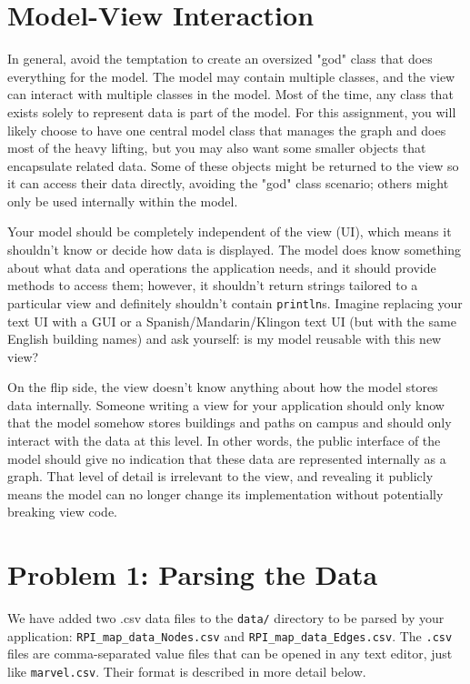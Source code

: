 \documentclass[11pt]{article}
\begin{document}
\section*{Model-View Interaction}
\label{sec:Model-View Interaction}

In general, avoid the temptation to create an oversized "god" class that does everything for the model. The model may contain multiple classes, and the view can interact with multiple classes in the model. Most of the time, any class that exists solely to represent data is part of the model. For this assignment, you will likely choose to have one central model class that manages the graph and does most of the heavy lifting, but you may also want some smaller objects that encapsulate related data. Some of these objects might be returned to the view so it can access their data directly, avoiding the "god" class scenario; others might only be used internally within the model.

\noindent Your model should be completely independent of the view (UI), which means it shouldn't know or decide how data is displayed. The model does know something about what data and operations the application needs, and it should provide methods to access them; however, it shouldn't return strings tailored to a particular view and definitely shouldn't contain \texttt{println}s. Imagine replacing your text UI with a GUI or a Spanish/Mandarin/Klingon text UI (but with the same English building names) and ask yourself: is my model reusable with this new view?

\noindent On the flip side, the view doesn't know anything about how the model stores data internally. Someone writing a view for your application should only know that the model somehow stores buildings and paths on campus and should only interact with the data at this level. In other words, the public interface of the model should give no indication that these data are represented internally as a graph. That level of detail is irrelevant to the view, and revealing it publicly means the model can no longer change its implementation without potentially breaking view code.

\section*{Problem 1: Parsing the Data}
\label{sec:Problem 1}

We have added two .csv data files to the \texttt{data/} directory to be parsed by your application: \texttt{RPI\_map\_data\_Nodes.csv} and \texttt{RPI\_map\_data\_Edges.csv}. The \texttt{.csv} files are comma-separated value files that can be opened in any text editor, just like \texttt{marvel.csv}. Their format is described in more detail below.
\end{document}
